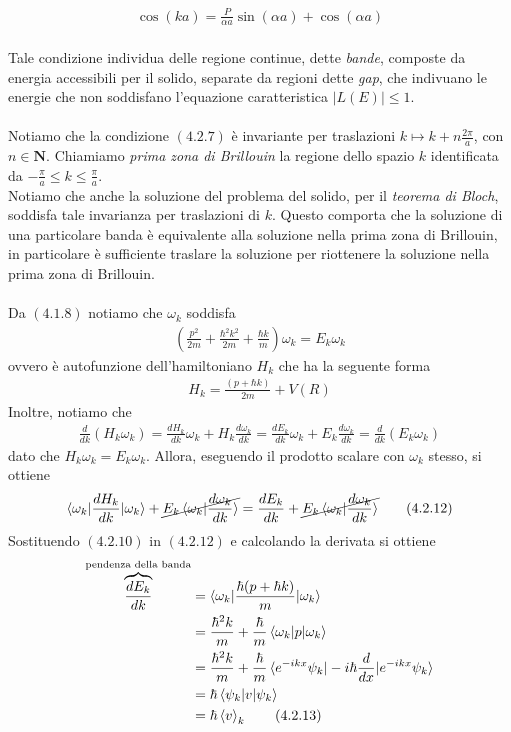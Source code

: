 \documentclass{article}
\begin{document}
\begin{align}
    \cos(ka) = \frac{P}{\alpha a}\sin(\alpha a) + \cos(\alpha a) \tag{4.2.8}
\end{align} \\
Tale condizione individua delle regione continue, dette \textit{bande}, composte da energia accessibili per il solido, separate da regioni dette \textit{gap}, che indivuano le energie che non soddisfano l'equazione caratteristica $|L(E)| \leq 1$. \\ \\
Notiamo che la condizione $(4.2.7)$ è invariante per traslazioni $k \mapsto k + n\frac{2\pi}{a}$, con $n \in \mathbf{N}$. Chiamiamo \textit{prima zona di Brillouin} la regione dello spazio $k$ identificata da $-\frac{\pi}{a} \leq k \leq \frac{\pi}{a}$. \\
Notiamo che anche la soluzione del problema del solido, per il \textit{teorema di Bloch}, soddisfa tale invarianza per traslazioni di $k$. Questo comporta che la soluzione di una particolare banda è equivalente alla soluzione nella prima zona di Brillouin, in particolare è sufficiente traslare la soluzione per riottenere la soluzione nella prima zona di Brillouin. \\ \\
Da $(4.1.8)$ notiamo che $\omega_k$ soddisfa
\begin{align}
    \left(\frac{p^2}{2m} + \frac{\hbar^2k^2}{2m} + \frac{\hbar k}{m}\right)\omega_k = E_k\omega_k \tag{4.2.9}
\end{align}
ovvero è autofunzione dell'hamiltoniano $H_k$ che ha la seguente forma
\begin{align}
    H_k = \frac{(p + \hbar k)}{2m} + V(R) \tag{4.2.10}
\end{align}
Inoltre, notiamo che 
\begin{align}
    \frac{d}{dk}(H_k\omega_k) = \frac{dH_k}{dk}\omega_k + H_k\frac{d\omega_k}{dk} = \frac{dE_k}{dk}\omega_k + E_k\frac{d\omega_k}{dk} = \frac{d}{dk}(E_k\omega_k) \tag{4.2.11}
\end{align}
dato che $H_k\omega_k = E_k\omega_k$. Allora, eseguendo il prodotto scalare con $\omega_k$ stesso, si ottiene 
\begin{align}
    \braket{\omega_k|\frac{dH_k}{dk}|\omega_k} + \cancel{E_k\braket{\omega_k|\frac{d\omega_k}{dk}}} = \frac{dE_k}{dk} + \cancel{E_k\braket{\omega_k|\frac{d\omega_k}{dk}}} \tag{4.2.12}
\end{align}
Sostituendo $(4.2.10)$ in $(4.2.12)$ e calcolando la derivata si ottiene
\begin{align}
    \overbrace{\frac{dE_k}{dk}}^{\text{pendenza della banda}} &= \braket{\omega_k|\frac{\hbar(p + \hbar k)}{m}|\omega_k} \notag \\
    &= \frac{\hbar^2k}{m} + \frac{\hbar}{m}\braket{\omega_k|p|\omega_k} \notag \\
    &= \frac{\hbar^2k}{m} + \frac{\hbar}{m}\braket{e^{-ikx}\psi_k|-i\hbar\frac{d}{dx}|e^{-ikx}\psi_k} \notag \\
    &= \hbar\braket{\psi_k|v|\psi_k} \notag \\
    &= \hbar\braket{v}_k \tag{4.2.13}
\end{align}
\end{document}
